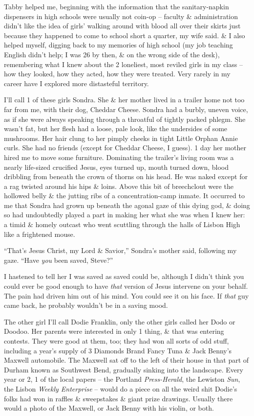 \documentclass{article}
\numberwithin{equation}{section}
\begin{document}
Tabby helped me, beginning with the information that the sanitary-napkin dispensers in high schools were usually not coin-op -- faculty \& administration didn't like the idea of girls' walking around with blood all over their skirts just because they happened to come to school short a quarter, my wife said. \& I also helped myself, digging back to my memories of high school (my job teaching English didn't help; I was 26 by then, \& on the wrong side of the desk), remembering what I knew about the 2 loneliest, most reviled girls in my class -- how they looked, how they acted, how they were treated. Very rarely in my career have I explored more distasteful territory.

I'll call 1 of these girls Sondra. She \& her mother lived in a trailer home not too far from me, with their dog, Cheddar Cheese. Sondra had a burbly, uneven voice, as if she were always speaking through a throatful of tightly packed phlegm. She wasn't fat, but her flesh had a loose, pale look, like the undersides of some mushrooms. Her hair clung to her pimply cheeks in tight Little Orphan Annie curls. She had no friends (except for Cheddar Cheese, I guess). 1 day her mother hired me to move some furniture. Dominating the trailer's living room was a nearly life-sized crucified Jesus, eyes turned up, mouth turned down, blood dribbling from beneath the crown of thorns on his head. He was naked except for a rag twisted around his hips \& loins. Above this bit of breechclout were the hollowed belly \& the jutting ribs of a concentration-camp inmate. It occurred to me that Sondra had grown up beneath the agonal gaze of this dying god, \& doing so had undoubtedly played a part in making her what she was when I knew her: a timid \& homely outcast who went scuttling through the halls of Lisbon High like a frightened mouse.

``That's Jesus Christ, my Lord \& Savior,'' Sondra's mother said, following my gaze. ``Have \textit{you} been saved, Steve?''

I hastened to tell her I was saved as saved could be, although I didn't think you could ever be good enough to have \textit{that} version of Jesus intervene on your behalf. The pain had driven him out of his mind. You could see it on his face. If \textit{that} guy came back, he probably wouldn't be in a saving mood.

The other girl I'll call Dodie Franklin, only the other girls called her Dodo or Doodoo. Her parents were interested in only 1 thing, \& that was entering contests. They were good at them, too; they had won all sorts of odd stuff, including a year's supply of 3 Diamonds Brand Fancy Tuna \& Jack Benny's Maxwell automobile. The Maxwell sat off to the left of their house in that part of Durham known as Southwest Bend, gradually sinking into the landscape. Every year or 2, 1 of the local papers -- the Portland \textit{Press-Herald}, the Lewiston \textit{Sun}, the Lisbon \textit{Weekly Enterprise} -- would do a piece on all the weird shit Dodie's folks had won in raffles \& sweepstakes \& giant prize drawings. Usually there would a photo of the Maxwell, or Jack Benny with his violin, or both.
\end{document}

